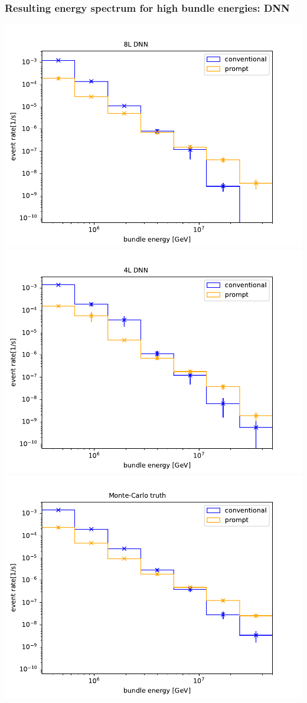 \documentclass[aspectratio=1610, 9pt]{beamer}
\begin{document}
\begin{frame}
  \frametitle{Resulting energy spectrum for high bundle energies: DNN}
  \includegraphics[scale=0.3]{Plots/spectrum_8L_bundle.pdf}
  \includegraphics[scale=0.3]{Plots/spectrum_4L_bundle.pdf}
  \includegraphics[scale=0.3]{Plots/spectrum_MC_bundle.pdf}

\end{frame}
\end{document}
